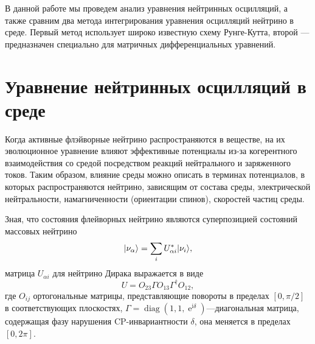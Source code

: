 \documentclass[a4paper,12pt]{article}
\newcommand{\diag}{\operatorname{diag}}
\renewcommand{\exp}{\operatorname{e}}
\renewcommand{\imath}{\mathrm{i}}
\DeclarePairedDelimiter\ket{|}{\rangle}
\begin{document}
В данной работе мы проведем анализ уравнения нейтринных осцилляций, а также сравним два метода интегрирования уравнения осцилляций нейтрино в среде. Первый метод использует широко известную схему Рунге-Кутта, второй --- предназначен специально для матричных дифференциальных уравнений.   

\newpage
\section{Уравнение нейтринных осцилляций в среде}

Когда активные флэйворные нейтрино распространяются в веществе, на их
эволюционное уравнение влияют эффективные потенциалы из-за когерентного
взаимодействия со средой посредством реакций нейтрального и заряженного
токов. Таким образом, влияние среды можно описать в терминах потенциалов, в
которых распространяются нейтрино, зависящим от состава среды, электрической
нейтральности, намагниченности (ориентации спинов), скоростей частиц среды.

Зная, что состояния флейворных нейтрино являются суперпозицией состояний
массовых нейтрино
\begin{equation}\label{eq:0}
	\ket{\nu_{\alpha}}=\sum_{i}U_{\alpha i}^{*}\ket{\nu_{i}},
\end{equation} 
матрица \(U_{\alpha i}\) для нейтрино Дирака выражается в виде
\begin{equation}
	U=O_{23}\Gamma O_{13}\Gamma^{\dagger}O_{12},
\end{equation}
где \(O_{ij}\) ортогональные матрицы, представляющие повороты в пределах
\([0,\pi/2]\) в соответствующих плоскостях,
\(\Gamma=\diag(1,1,\exp^{\imath\delta})\)---диагональная матрица, содержащая
фазу нарушения CP-инвариантности \(\delta\), она меняется в пределах
\([0,2\pi]\).
\end{document}

